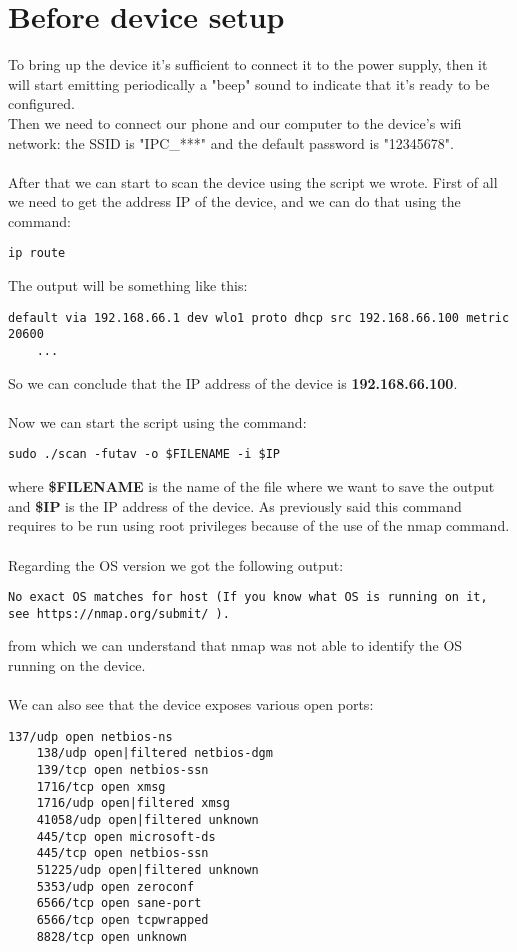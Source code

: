 \chapter{Before device setup}
To bring up the device it's sufficient to connect it to the power supply, then it
will start emitting periodically a "beep" sound to indicate that it's ready to be configured.\\
Then we need to connect our phone and our computer to the device's wifi network:
the SSID is "IPC\_***" and the default password is "12345678".\\\\
After that we can start to scan the device using the script we wrote. First of all
we need to get the address IP of the device, and we can do that using the command:
\begin{lstlisting}[numbers=none]
    ip route
\end{lstlisting}
The output will be something like this:
\begin{lstlisting}[numbers=none]
    default via 192.168.66.1 dev wlo1 proto dhcp src 192.168.66.100 metric 20600 
    ...
\end{lstlisting}
So we can conclude that the IP address of the device is \textbf{192.168.66.100}.\\\\
Now we can start the script using the command:
\begin{lstlisting}[numbers=none]
    sudo ./scan -futav -o $FILENAME -i $IP
\end{lstlisting}
where \textbf{\$FILENAME} is the name of the file where we want to save the output
and \textbf{\$IP} is the IP address of the device. As previously
said this command requires to be run using root privileges
because of the use of the nmap command.\\\\
Regarding the OS version we got the following output:
\begin{lstlisting}[numbers=none]
    No exact OS matches for host (If you know what OS is running on it, see https://nmap.org/submit/ ).
\end{lstlisting}
from which we can understand that nmap was not able to identify the OS running
on the device.\\\\
We can also see that the device exposes various open ports:
\begin{lstlisting}[numbers=none]
    137/udp open netbios-ns
    138/udp open|filtered netbios-dgm
    139/tcp open netbios-ssn
    1716/tcp open xmsg
    1716/udp open|filtered xmsg
    41058/udp open|filtered unknown
    445/tcp open microsoft-ds
    445/tcp open netbios-ssn
    51225/udp open|filtered unknown
    5353/udp open zeroconf
    6566/tcp open sane-port
    6566/tcp open tcpwrapped
    8828/tcp open unknown
\end{lstlisting}
